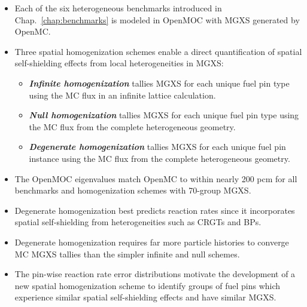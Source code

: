 \vfill
\begin{highlightsbox}[frametitle=Highlights]
\begin{itemize}
  \item Each of the six heterogeneous benchmarks introduced in Chap.~\ref{chap:benchmarks} is modeled in OpenMOC with \ac{MGXS} generated by OpenMC.
  \item Three spatial homogenization schemes enable a direct quantification of spatial self-shielding effects from local heterogeneities in \ac{MGXS}:
  \begin{itemize}
    \item \textbf{\textit{Infinite homogenization}} tallies \ac{MGXS} for each unique fuel pin type using the \ac{MC} flux in an infinite lattice calculation.
    \item \textbf{\textit{Null homogenization}} tallies \ac{MGXS} for each unique fuel pin type using the \ac{MC} flux from the complete heterogeneous geometry.
    \item \textbf{\textit{Degenerate homogenization}} tallies \ac{MGXS} for each unique fuel pin instance using the \ac{MC} flux from the complete heterogeneous geometry.
  \end{itemize}
  \item The OpenMOC eigenvalues match OpenMC to within nearly 200 \ac{pcm} for all benchmarks and homogenization schemes with 70-group \ac{MGXS}.
  \item Degenerate homogenization best predicts reaction rates since it incorporates spatial self-shielding from heterogeneities such as \acp{CRGT} and \acp{BP}.
  \item Degenerate homogenization requires far more particle histories to converge \ac{MC} \ac{MGXS} tallies than the simpler infinite and null schemes.
  \item The pin-wise reaction rate error distributions motivate the development of a new spatial homogenization scheme to identify groups of fuel pins which experience similar spatial self-shielding effects and have similar \ac{MGXS}.
\end{itemize}
\end{highlightsbox}
\vfill